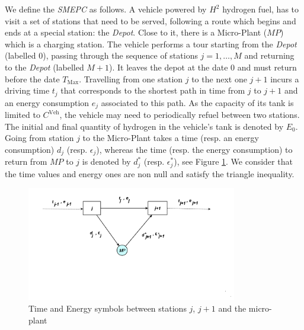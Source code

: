 \documentclass[11pt]{article}
\theoremstyle{plain}%
\theoremstyle{definition} \newtheorem{lem}{Lemma}[section]
\theoremstyle{definition} \newtheorem{claim}{Claim}[lem]
\theoremstyle{definition} \newtheorem{theorem}{Theorem}[section]
\theoremstyle{definition} \newtheorem{exo}{Exercice n$^\circ$}
\theoremstyle{definition} \newtheorem{quest}{}[exo]
\theoremstyle{definition} \newtheorem{sousquest}{}[quest]
\theoremstyle{remark}
\theoremstyle{definition}
\begin{document}
We define the \emph{SMEPC} as follows. A vehicle powered by $H^2$ hydrogen fuel, has to visit a set of stations that need to be served, following a route which begins and ends at a special station: the \emph{Depot}. Close to it, there is a Micro-Plant ($MP$) which is a charging station. The vehicle performs a tour starting from the \emph{Depot} 
(labelled $0$), passing through the sequence of stations $j=1, \ldots, M$ and returning to the \emph{Depot}
 (labelled $M+1$). It leaves the depot at the date $0$ and must return before the date $T_{\textrm{Max}}$.  Travelling from one station $j$ to the next one $j+1$ incurs a driving time $t_j$ that corresponds to the shortest path in time from $j$ to $j+1$ and an energy consumption $e_j$ associated to this path. As the capacity of its tank is limited to $C^{\textrm{Veh}}$, the vehicle may need to periodically refuel between two stations. 
The initial and final quantity of hydrogen in the vehicle's tank is denoted by $E_0$. Going from station $j$ to the Micro-Plant takes a time (resp. an energy consumption) $d_j$ (resp. $\epsilon_j$), whereas the time 
(resp. the  energy consumption) to return from $MP$ to $j$ is denoted by $d^*_{j}$ (resp. $\epsilon^*_{j}$),
see Figure \ref{Notation_inputs}. We consider that the time values and energy ones are non null and satisfy the triangle inequality.\\
\begin{figure}[!ht]
	\centerline{
		\includegraphics[height=50mm]{Notation.png}}
	\caption[]{Time and Energy symbols between  stations $j$,  $j+1$ and the micro-plant}
	\label{Notation_inputs}
\end{figure}
\end{document}
